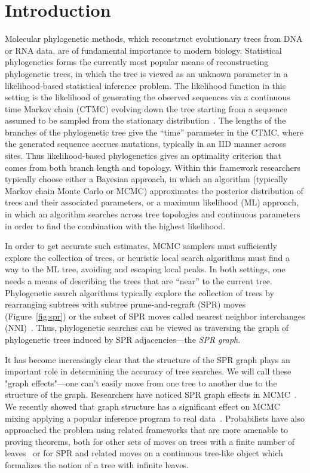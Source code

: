\documentclass[11pt,onecolumn,conference]{IEEEtran}
\begin{document}
\pagebreak


\section{Introduction}
Molecular phylogenetic methods, which reconstruct evolutionary trees from DNA or RNA data, are of fundamental importance to modern biology.
Statistical phylogenetics forms the currently most popular means of reconstructing phylogenetic trees, in which the tree is viewed as an unknown parameter in a likelihood-based statistical inference problem.
The likelihood function in this setting is the likelihood of generating the observed sequences via a continuous time Markov chain (CTMC) evolving down the tree starting from a sequence assumed to be sampled from the stationary distribution~\cite{felsenstein1981evolutionary}.
The lengths of the branches of the phylogenetic tree give the ``time'' parameter in the CTMC, where the generated sequence accrues mutations, typically in an IID manner across sites.
Thus likelihood-based phylogenetics gives an optimality criterion that comes from both branch length and topology.
Within this framework researchers typically choose either a Bayesian approach, in which an algorithm (typically Markov chain Monte Carlo or MCMC) approximates the posterior distribution of trees and their associated parameters, or a maximum likelihood (ML) approach, in which an algorithm searches across tree topologies and continuous parameters in order to find the combination with the highest likelihood.

In order to get accurate such estimates, MCMC samplers must sufficiently explore the collection of trees, or heuristic local search algorithms must find a way to the ML tree, avoiding and escaping local peaks.
In both settings, one needs a means of describing the trees that are ``near'' to the current tree.
Phylogenetic search algorithms typically explore the collection of trees by rearranging subtrees with subtree prune-and-regraft (SPR) moves (Figure~\ref{fig:spr}) or the subset of SPR moves called nearest neighbor interchanges (NNI)~\cite{robinson1971comparison}.
Thus, phylogenetic searches can be viewed as traversing the graph of phylogenetic trees induced by SPR adjacencies---the \emph{SPR graph}.

It has become increasingly clear that the structure of the SPR graph plays an important role in determining the accuracy of tree searches.
We will call these "graph effects"---one can't easily move from one tree to another due to the structure of the graph.
Researchers have noticed SPR graph effects in MCMC~\cite{Mossel2005-ly,Mossel2006-fo,Ronquist2006-fv,Stefankovic2011-hu}.
We recently showed that graph structure has a significant effect on MCMC mixing applying a popular inference program to real data~\cite{Whidden2015-yi}.
Probabilists have also approached the problem using related frameworks that are more amenable to proving theorems, both for other sets of moves on trees with a finite number of leaves~\cite{Aldous2000-vg,Diaconis2002-gy} or for SPR and related moves on a continuous tree-like object which formalizes the notion of a tree with infinite leaves\cite{Evans2006-xh,Athreya2014-de}.
\end{document}
